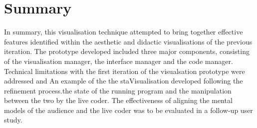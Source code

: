 \more













\section{Summary}

In summary, this visualisation technique attempted to bring together effective features identified within the aesthetic and didactic visualisations of the previous iteration. The prototype developed included three major components, consisting of the visualisation manager, the interface manager and the code manager. Technical limitations with the first iteration of the visualsation prototype were addressed and  An example of the the staVisualisation developed following the refinement process.the state of the running program and the manipulation between the two by the live coder. The effectiveness of aligning the mental models of the audience and the live coder was to be evaluated in a follow-up user study.



